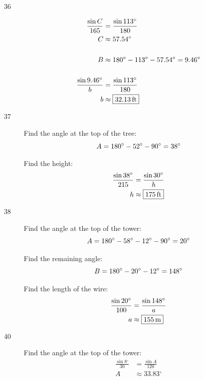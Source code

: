 \documentclass{exam}
\newcommand{\dg}{\ensuremath{^\circ}}
\begin{document}
\begin{description}
      \item[36] 
        \begin{align*}
          \frac{\sin C}{165} & = \frac{\sin 113 \dg}{180} \\
          C                  & \approx 57.54 \dg \\
          \\
          B & \approx 180 \dg - 113 \dg - 57.54 \dg = 9.46 \dg \\
          \\
          \frac{\sin 9.46 \dg}{b} & = \frac{\sin 113 \dg}{180} \\
          b                       & \approx \boxed{ \unit[32.13]{ft} } \\
        \end{align*}

      \item[37] 
        Find the angle at the top of the tree:
        \[
          A = 180 \dg - 52 \dg - 90 \dg = 38 \dg \\
        \]

        Find the height:
        \begin{align*}
          \frac{\sin 38 \dg}{215} & = \frac{\sin 30 \dg}{h} \\
          h                       & \approx \boxed{ \unit[175]{ft} } \\
        \end{align*}

      \item[38] 
        Find the angle at the top of the tower:
        \[
          A = 180 \dg - 58 \dg - 12 \dg - 90 \dg = 20 \dg \\
        \]

        Find the remaining angle:
        \[
          B = 180 \dg - 20 \dg - 12 \dg = 148 \dg \\
        \]

        Find the length of the wire:
        \begin{align*}
          \frac{\sin 20 \dg}{100} & = \frac{\sin 148 \dg}{a} \\
          a                       & \approx \boxed{ \unit[155]{m} } \\
        \end{align*}

      \item[40] 
        Find the angle at the top of the tower:
        \begin{align*}
          \frac{\sin 8 \dg}{30} & = \frac{\sin A}{120} \\
          A                     & \approx 33.83 \dg \\
        \end{align*}


\end{description}
\end{document}
